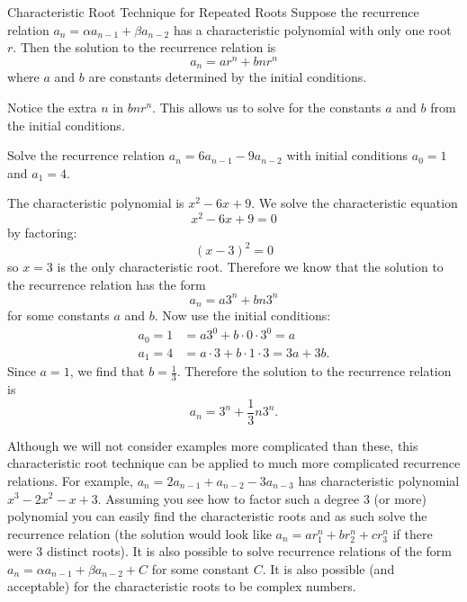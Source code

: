 \documentclass[12pt]{article}
\begin{document}
\begin{defbox}{Characteristic Root Technique for Repeated Roots}
 Suppose the recurrence relation $a_n = \alpha a_{n-1} + \beta a_{n-2}$ has a characteristic polynomial with only one root $r$.  Then the solution to the recurrence relation is
 \[a_n = ar^n + bnr^n\]
 where $a$ and $b$ are constants determined by the initial conditions.
\end{defbox}

Notice the extra $n$ in $bnr^n$.  This allows us to solve for the constants $a$ and $b$ from the initial conditions.

\begin{example}
 Solve the recurrence relation $a_n = 6a_{n-1} - 9a_{n-2}$ with initial conditions $a_0 = 1$ and $a_1 = 4$.  
 \begin{solution}
  The characteristic polynomial is $x^2 - 6x + 9$.  We solve the characteristic equation
  \[x^2 - 6x + 9 = 0\]
  by factoring:
  \[(x - 3)^2 = 0\]
  so $x =3$ is the only characteristic root.  Therefore we know that the solution to the recurrence relation has the form
  \[a_n = a 3^n + bn3^n\]
  for some constants $a$ and $b$.  Now use the initial conditions:
  \begin{align*}
   a_0 = 1 &= a 3^0 + b\cdot 0 \cdot 3^0 = a\\
   a_1 = 4 &= a\cdot 3 + b\cdot 1 \cdot3 = 3a + 3b.
  \end{align*}
  Since $a = 1$, we find that $b = \frac{1}{3}$.  Therefore the solution to the recurrence relation is
  \[a_n = 3^n + \frac{1}{3}n3^n.\]
 \end{solution}


 
\end{example}

 Although we will not consider examples more complicated than these, this characteristic root technique can be applied to much more complicated recurrence relations.  For example, $a_n = 2a_{n-1} + a_{n-2} - 3a_{n-3}$ has characteristic polynomial $x^3 - 2 x^2 - x + 3$.  Assuming you see how to factor such a degree 3 (or more) polynomial you can easily find the characteristic roots and as such solve the recurrence relation (the solution would look like $a_n = ar_1^n + br_2^n + cr_3^n$ if there were 3 distinct roots).  It is also possible to solve recurrence relations of the form $a_n = \alpha a_{n-1} + \beta a_{n-2} + C$ for some constant $C$.  It is also possible (and acceptable) for the characteristic roots to be complex numbers.
\end{document}
